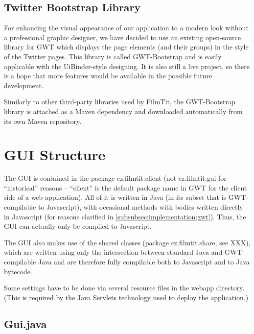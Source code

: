 \subsection{Twitter Bootstrap Library}
For enhancing the visual appearance of our application to a modern look without a professional graphic designer, we have decided to use an existing open-source library for GWT which displays the page elements (and their groups) in the style of the Twitter pages. This library is called GWT-Bootstrap and is easily applicable with the UiBinder-style designing. It is also still a live project, so there is a hope that more features would be available in the possible future development.

Similarly to other third-party libraries used by FilmTit, the GWT-Bootstrap library is attached as a Maven dependency and downloaded automatically from its own Maven repository.


\section{GUI Structure}

The GUI is contained in the package cz.filmtit.client (not cz.filmtit.gui for ``historical'' reasons -- ``client'' is the default package name in GWT for the client side of a web application). All of it is written in Java (in its subset that is GWT-compilable to Javascript), with occasional methods with bodies written directly in Javascript (for reasons clarified in \ref{subsubsec:implementation:gwt}). Thus, the GUI can actually only be compiled to Javascript.

The GUI also makes use of the shared classes (package cz.filmtit.share, see XXX), which are written using only the intersection between standard Java and GWT-compilable Java and are therefore fully compilable both to Javascript and to Java bytecode.

Some settings have to be done via several resource files in the webapp directory. (This is required by the Java Servlets technology used to deploy the application.)


\subsection{Gui.java}

